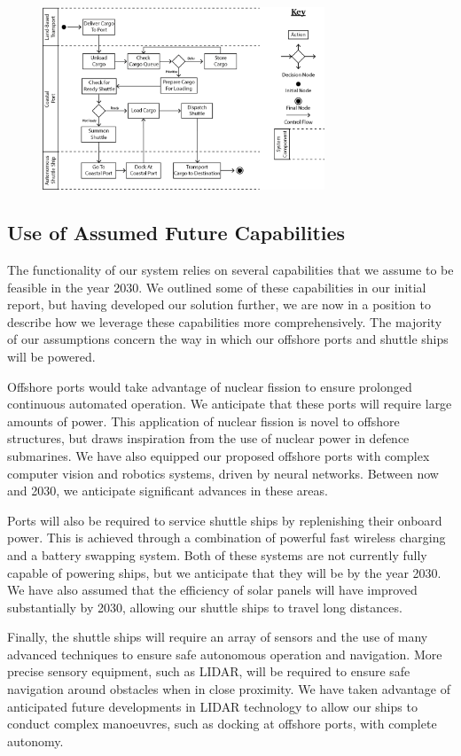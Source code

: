 \begin{figure}[h!]
\centering
	\includegraphics[width=0.75\textwidth]{images/arch_3}
	\caption{}
	\label{fig:arch_3}
\end{figure}

\subsection{Use of Assumed Future Capabilities}

The functionality of our system relies on several capabilities that we assume to be feasible in the year 2030. We outlined some of these capabilities in our initial report, but having developed our solution further, we are now in a position to describe how we leverage these capabilities more comprehensively. The majority of our assumptions concern the way in which our offshore ports and shuttle ships will be powered.

Offshore ports would take advantage of nuclear fission to ensure prolonged continuous automated operation. We anticipate that these ports will require large amounts of power. This application of nuclear fission is novel to offshore structures, but draws inspiration from the use of nuclear power in defence submarines. We have also equipped our proposed offshore ports with complex computer vision and robotics systems, driven by neural networks. Between now and 2030, we anticipate significant advances in these areas.

Ports will also be required to service shuttle ships by replenishing their onboard power. This is achieved through a combination of powerful fast wireless charging and a battery swapping system. Both of these systems are not currently fully capable of powering ships, but we anticipate that they will be by the year 2030. We have also assumed that the efficiency of solar panels will have improved substantially by 2030, allowing our shuttle ships to travel long distances.

Finally, the shuttle ships will require an array of sensors and the use of many advanced techniques to ensure safe autonomous operation and navigation. More precise sensory equipment, such as LIDAR, will be required to ensure safe navigation around obstacles when in close proximity. We have taken advantage of anticipated future developments in LIDAR technology to allow our ships to conduct complex manoeuvres, such as docking at offshore ports, with complete autonomy.



